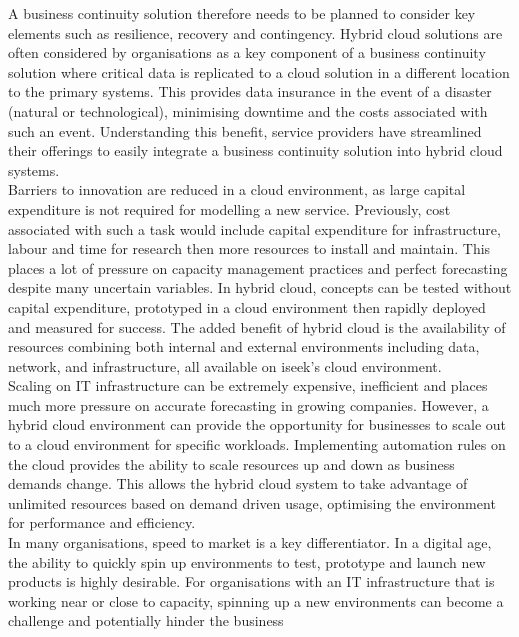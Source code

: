 \documentclass[a4paper,12pt]{report}
\begin{document}
A business continuity solution therefore needs to be planned to consider key elements such as resilience, recovery and contingency. Hybrid cloud solutions are often considered by organisations as a key component of a business continuity solution where critical data is replicated to a cloud solution in a different location to the primary systems. This provides data insurance in the event of a disaster (natural or technological), minimising downtime and the costs associated with such an event. Understanding this benefit, service providers have streamlined their offerings to easily integrate a business continuity solution into hybrid cloud systems.\\

Barriers to innovation are reduced in a cloud environment, as large capital expenditure is not required for modelling a new service. Previously, cost associated with such a task would include capital expenditure for infrastructure, labour and time for research then more resources to install and maintain. This places a lot of pressure on capacity management practices and perfect forecasting despite many uncertain variables. In hybrid cloud, concepts can be tested without capital expenditure, prototyped in a cloud environment then rapidly deployed and measured for success. The added benefit of hybrid cloud is the availability of resources combining both internal and external environments including data, network, and infrastructure, all available on iseek’s cloud environment.\\

Scaling on IT infrastructure can be extremely expensive, inefficient and places much more pressure on accurate forecasting in growing companies. However, a hybrid cloud environment can provide the opportunity for businesses to scale out to a cloud environment for specific workloads. Implementing automation rules on the cloud provides the ability to scale resources up and down as business demands change. This allows the hybrid cloud system to take advantage of unlimited resources based on demand driven usage, optimising the environment for performance and efficiency.\\

In many organisations, speed to market is a key differentiator. In a digital age, the ability to quickly spin up environments to test, prototype and launch new products is highly desirable. For organisations with an IT infrastructure that is working near or close to capacity, spinning up a new environments can become a challenge and potentially hinder the business\\
\end{document}
